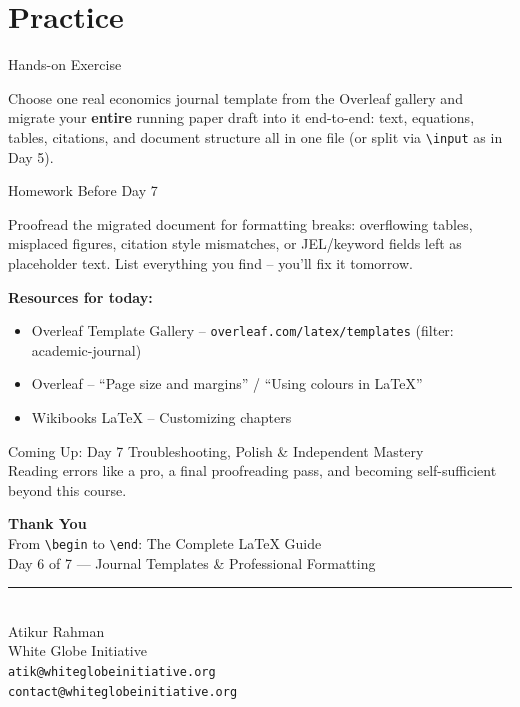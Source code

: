 \documentclass[11pt,aspectratio=169,table]{beamer}
\begin{document}
\section{Practice}

\begin{frame}{Hands-on Exercise}
  \begin{exercisebox}
    Choose one real economics journal template from the Overleaf
    gallery and migrate your \textbf{entire} running paper draft into
    it end-to-end: text, equations, tables, citations, and document
    structure all in one file (or split via \texttt{\textbackslash input} as in Day 5).
  \end{exercisebox}
\end{frame}

\begin{frame}{Homework Before Day 7}
  \begin{homeworkbox}
    Proofread the migrated document for formatting breaks: overflowing
    tables, misplaced figures, citation style mismatches, or JEL/keyword
    fields left as placeholder text. List everything you find -- you'll
    fix it tomorrow.
  \end{homeworkbox}
  \vspace{10pt}
  \small\textbf{Resources for today:}
  \begin{itemize}\small
    \item Overleaf Template Gallery -- \texttt{overleaf.com/latex/templates} (filter: academic-journal)
    \item Overleaf -- ``Page size and margins'' / ``Using colours in LaTeX''
    \item Wikibooks LaTeX -- Customizing chapters
  \end{itemize}
\end{frame}

\begin{frame}{Coming Up: Day 7}
  \Large
  \centering
  Troubleshooting, Polish \& Independent Mastery \\[6pt]
  \normalsize
  Reading errors like a pro, a final proofreading pass, and
  becoming self-sufficient beyond this course.
\end{frame}

\begin{frame}[plain]
  \begin{center}
    \vspace{35pt}
    {\Large\bfseries Thank You}\\[10pt]
    {\large From \texttt{\textbackslash begin} to \texttt{\textbackslash end}: The Complete LaTeX Guide}\\[4pt]
    Day 6 of 7 --- Journal Templates \& Professional Formatting\\[20pt]
    \rule{0.5\textwidth}{0.4pt}\\[10pt]
    Atikur Rahman \\
    White Globe Initiative \\[2pt]
    \texttt{atik@whiteglobeinitiative.org} \\
    \texttt{contact@whiteglobeinitiative.org}
  \end{center}
\end{frame}
\end{document}

